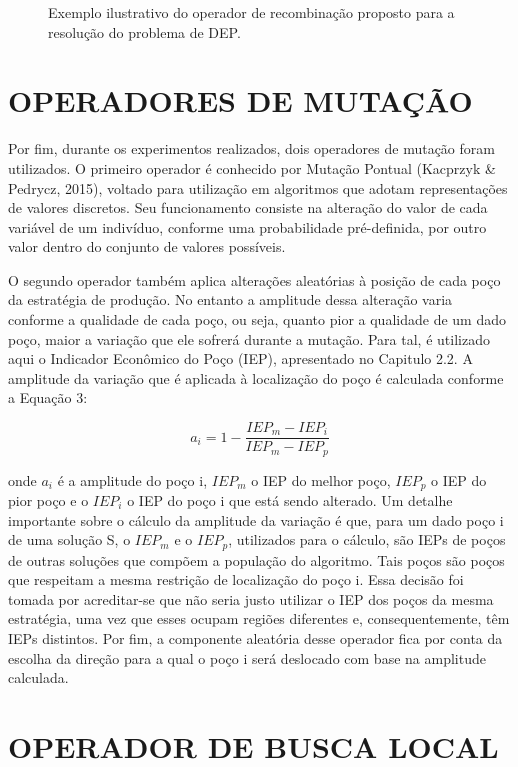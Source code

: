 \begin{figure}[htb]

\caption{Exemplo ilustrativo do operador de recombinação proposto para a resolução do problema de DEP.}


\end{figure}

\section{OPERADORES DE MUTAÇÃO}

Por fim, durante os experimentos realizados, dois operadores de mutação foram utilizados. O primeiro operador é conhecido por Mutação Pontual (Kacprzyk \& Pedrycz, 2015), voltado para utilização em algoritmos que adotam representações de valores discretos. Seu funcionamento consiste na alteração do valor de cada variável de um indivíduo, conforme uma probabilidade pré-definida, por outro valor dentro do conjunto de valores possíveis.

O segundo operador também aplica alterações aleatórias à posição de cada poço da estratégia de produção. No entanto a amplitude dessa alteração varia conforme a qualidade de cada poço, ou seja, quanto pior a qualidade de um dado poço, maior a variação que ele sofrerá durante a mutação. Para tal, é utilizado aqui o Indicador Econômico do Poço (IEP), apresentado no Capitulo 2.2. A amplitude da variação que é aplicada à localização do poço é calculada conforme a Equação 3:

$$a_i = 1 - \frac{IEP_m -IEP_i}{IEP_m -IEP_p}$$

onde $a_i$ é a amplitude do poço i, $IEP_m$ o IEP do melhor poço, $IEP_p$ o IEP do pior poço e o $IEP_i$  o IEP do poço i que está sendo alterado. Um detalhe importante sobre o cálculo da amplitude da variação é que, para um dado poço i de uma solução S, o $IEP_m$ e o $IEP_p$, utilizados para o cálculo, são IEPs de poços de outras soluções que compõem a população do algoritmo. Tais poços são poços que respeitam a mesma restrição de localização do poço i. Essa decisão foi tomada por acreditar-se que não seria justo utilizar o IEP dos poços da mesma estratégia, uma vez que esses ocupam regiões diferentes e, consequentemente, têm IEPs distintos. Por fim, a componente aleatória desse operador fica por conta da escolha da direção para a qual o poço i será deslocado com base na amplitude calculada.

\section{OPERADOR DE BUSCA LOCAL}

